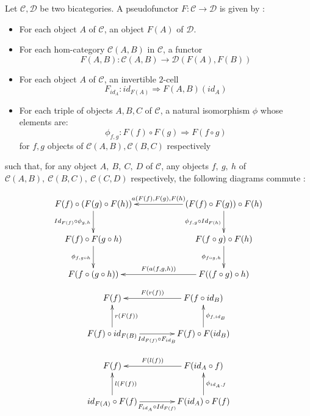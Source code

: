 \documentclass[10pt]{llncs}
\begin{document}
\begin{definition}\label{definition/pseudofunctor}
Let $\mathcal{C}, \mathcal{D}$ be two bicategories. A pseudofunctor $F:\mathcal{C}\rightarrow \mathcal{D}$ is given by :
\begin{itemize}
\item For each object $A$ of $\mathcal{C}$, an object $F(A)$ of $\mathcal{D}$.
\item For each hom-category $\mathcal{C}(A,B)$ in $\mathcal{C}$, a functor $$F(A,B): \mathcal{C}(A,B) \rightarrow \mathcal{D}(F(A),F(B))$$
\item For each object $A$ of $\mathcal{C}$, an invertible $2$-cell $$F_{id_A}: id_{F(A)} \Rightarrow F(A,B)(id_A)$$
\item For each triple of objects $A,B,C$ of $\mathcal{C}$, a natural isomorphism $\phi$ whose elements are:$$\phi_{f,g} :F(f) \circ F(g) \Rightarrow F(f \circ g)$$ for $f,g$ objects of $\mathcal{C}(A,B), \mathcal{C}(B,C)$ respectively
\end{itemize}
such that, for any object $A,~B,~C,~D$ of $\mathcal{C}$, any objects $f,~g,~h$ of $\mathcal{C}(A,B),~\mathcal{C}(B,C),~\mathcal{C}(C,D)$ respectively, the following diagrams commute :

$$\xymatrix @-1.2pc {
F(f) \circ (F(g) \circ F(h))
\ar[dd]_-{Id_{F(f)} \circ \phi_{g,h} }
&&&&
(F(f) \circ F(g)) \circ F(h)
\ar[llll]_-{a(F(f),F(g),F(h)}
\ar[dd]_-{\phi_{f,g} \circ Id_{F(h)}}
\\
\\
F(f) \circ F(g \circ h)
\ar[dd]_-{\phi_{f,g \circ h} }
&&&&
F(f \circ g) \circ F(h)
\ar[dd]_-{\phi_{f \circ g, h} }
\\
\\
F(f\circ(g\circ h))
&&&&
F((f \circ g) \circ h)
\ar[llll]_-{F(a(f,g,h))}
}
$$
$$
\xymatrix @-1.2pc {
F(f)
&&&
F(f \circ id_B)
\ar[lll]_-{F(r(f))}
\\
\\
F(f) \circ id_{F(B)}
\ar[uu]_-{r(F(f))}
\ar[rrr]_-{ Id_{F(f)}  \circ F_{id_B} }
&&&
F(f) \circ F(id_B)
\ar[uu]_-{\phi_{f, id_B}}
}
$$

$$
\xymatrix @-1.2pc {
F(f)
&&&
F(id_A \circ f )
\ar[lll]_-{F(l(f))}
\\
\\
 id_{F(A)} \circ F(f) 
\ar[uu]_-{l(F(f))}
\ar[rrr]_-{ F_{id_A}  \circ Id_{F(f)}  }
&&&
 F(id_A) \circ F(f) 
\ar[uu]_-{\phi_{id_A, f}}
}
$$
\end{definition}
\end{document}
